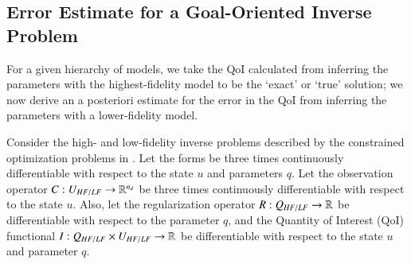 \subsection[Error Estimate for a Goal-Oriented Inverse Problem]{Error Estimate for a Goal-Oriented Inverse Problem}  \label{sec:deriv}
%
For a given hierarchy of models, we take the QoI calculated from inferring the parameters with the highest-fidelity model to be the `exact' or `true' solution; we now derive an a posteriori estimate for the error in the QoI from inferring the parameters with a lower-fidelity model.
%
\begin{proposition}
\label{thm:error_estimate}
Consider the high- and low-fidelity inverse problems described by the constrained optimization problems in . Let the forms  be three times continuously differentiable with respect to the state $u$ and parameters $q$. Let the observation operator $C:U_{HF/LF}\to{\mathbb{R}}^{n_d}$ be three times continuously differentiable with respect to the state $u$. Also, let the regularization operator $R:Q_{HF/LF}\to{\mathbb{R}}$ be differentiable with respect to the parameter $q$, and the Quantity of Interest (QoI) functional $I:Q_{HF/LF}\times U_{HF/LF}\to{\mathbb{R}}$ be differentiable with respect to the state $u$ and parameter $q$.


\end{proposition}
